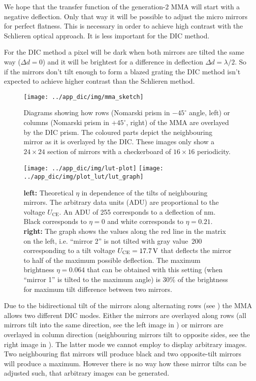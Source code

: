 We hope that the transfer function of the generation-2 MMA will start
with a negative deflection. Only that way it will be possible to
adjust the micro mirrors for perfect flatness. This is necessary in
order to achieve high contrast with the Schlieren optical approach. It
is less important for the DIC method.

For the DIC method a pixel will be dark when both mirrors are tilted
the same way ($\Delta d=0$) and it will be brightest for a difference
in deflection $\Delta d=\lambda/2$. So if the mirrors don't tilt
enough to form a blazed grating the DIC method isn't expected to
achieve higher contrast than the Schlieren method.

\begin{figure}[ht]
  \centering
  \texttt{[image: ../app\_dic/img/mma\_sketch]}

  \caption{ Diagrams showing how rows (Nomarski prism in $-45^\circ$
    angle, left) or columns (Nomarski prism in $+45^\circ$, right) of
    the MMA are overlayed by the DIC prism. The coloured parts depict
    the neighbouring mirror as it is overlayed by the DIC. These
    images only show a $24\times 24$ section of mirrors with a
    checkerboard of $16\times 16$ periodicity.}
  \label{fig:screen}
\end{figure}
\begin{figure}[htb]
  \centering
  \texttt{[image: ../app\_dic/img/lut-plot]}
  \texttt{[image: ../app\_dic/img/plot\_lut/lut\_graph]}

  \caption{{\bf left:} Theoretical $\eta$ in dependence of the tilts
    of neighbouring mirrors. The arbitrary data units (ADU) are
    proportional to the voltage $U_\textrm{CE}$. An ADU of 255
    corresponds to a deflection of \unit[134]{nm}. Black corresponds
    to $\eta=0$ and white corresponds to $\eta=0.21$. {\bf right:} The
    graph shows the values along the red line in the matrix on the
    left, i.e. ``mirror 2'' is not tilted with gray value~200
    corresponding to a tilt voltage $U_\textrm{CE}=\unit[17.7]{V}$
    that deflects the mirror to half of the maximum possible
    deflection. The maximum brightness $\eta=0.064$ that can be
    obtained with this setting (when ``mirror 1'' is tilted to the
    maximum angle) is $30\%$ of the brightness for maximum tilt
    difference between two mirrors.}
  \label{fig:deflection2}
\end{figure}
Due to the bidirectional tilt of the mirrors along alternating rows
(see ) the MMA allows two different DIC modes.
Either the mirrors are overlayed along rows (all mirrors tilt into the
same direction, see the left image in ) or mirrors
are overlayed in column direction (neighbouring mirrors tilt to
opposite sides, see the right image in ). The
latter mode we cannot employ to display arbitrary images.  Two
neighbouring flat mirrors will produce black and two opposite-tilt
mirrors will produce a maximum. However there is no way how these
mirror tilts can be adjusted such, that arbitrary images can be
generated.

